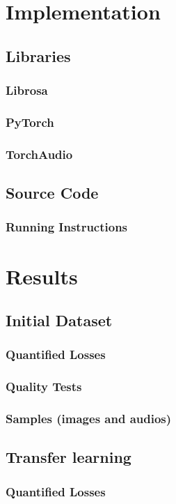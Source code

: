 \documentclass{book}
\begin{document}
\chapter{Implementation}
  \section{Libraries}
    \subsection{Librosa}
    \subsection{PyTorch}
    \subsection{TorchAudio}
  \section{Source Code}
    \subsection{Running Instructions}

\chapter{Results}
  \section{Initial Dataset}
    \subsection{Quantified Losses}
    \subsection{Quality Tests}
    \subsection{Samples (images and audios)}
  \section{Transfer learning}
    \subsection{Quantified Losses}
\end{document}
